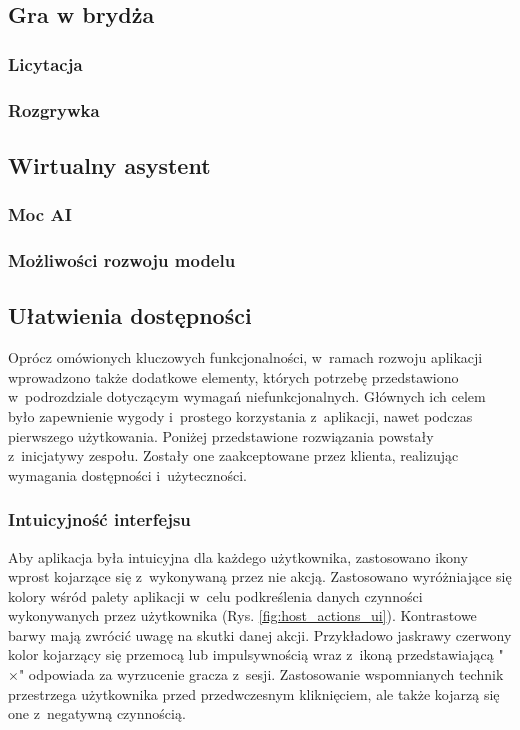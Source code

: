 \subsection{Gra w brydża}

\subsubsection{Licytacja}
\subsubsection{Rozgrywka}


\subsection{Wirtualny asystent}

\subsubsection{Moc AI}
\label{subsubsec:mocai}

\subsubsection{Możliwości rozwoju modelu}

\subsection{Ułatwienia dostępności}

Oprócz omówionych kluczowych funkcjonalności, w~ramach rozwoju
aplikacji wprowadzono także dodatkowe elementy, których
potrzebę przedstawiono w~podrozdziale dotyczącym wymagań
niefunkcjonalnych. Głównych ich celem było zapewnienie
wygody i~prostego korzystania z~aplikacji, nawet podczas
pierwszego użytkowania. Poniżej przedstawione rozwiązania powstały
z~inicjatywy zespołu. Zostały one zaakceptowane przez klienta,
realizując wymagania dostępności i~użyteczności.

\subsubsection{Intuicyjność interfejsu}

Aby aplikacja była intuicyjna dla każdego użytkownika,
zastosowano ikony wprost kojarzące się z~wykonywaną
przez nie akcją. Zastosowano wyróżniające się kolory wśród palety
aplikacji w~celu podkreślenia danych czynności wykonywanych
przez użytkownika (Rys. \ref{fig:host_actions_ui}). Kontrastowe barwy mają zwrócić uwagę na
skutki danej akcji. Przykładowo jaskrawy czerwony kolor
kojarzący się przemocą lub impulsywnością wraz z~ikoną
przedstawiającą "$\times$"\xspace odpowiada za wyrzucenie gracza
z~sesji. Zastosowanie wspomnianych technik przestrzega
użytkownika przed przedwczesnym kliknięciem, ale także kojarzą
się one z~negatywną czynnością.

